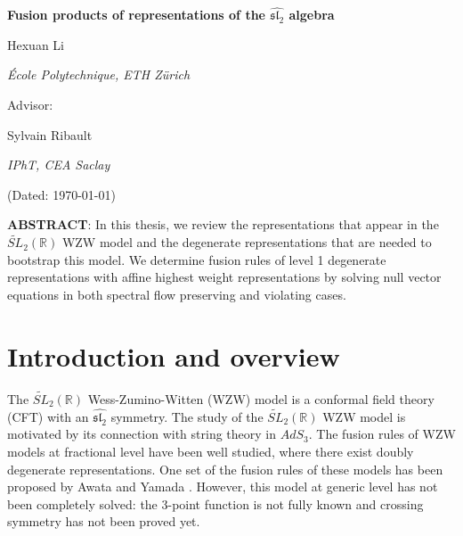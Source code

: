 \documentclass[10pt,a4paper]{article}
\numberwithin{equation}{section}
\newcommand{\TheTitle}{Fusion products of representations of the $\widehat{\mathfrak{sl}_{2}}$ algebra}
\newcommand{\StudentName}{Hexuan Li}
\newcommand{\StudentAffiliation}{École Polytechnique, ETH Zürich} %
\newcommand{\SupervisorName}{Sylvain Ribault}
\newcommand{\SupervisorAffiliation}{IPhT, CEA Saclay}
\begin{document}
\thispagestyle{empty}

\begin{center}

    {\LARGE\bfseries \TheTitle \par}

    \vspace{2cm} %

    {\large \StudentName \par}
    {\itshape \StudentAffiliation \par}

    \vspace{1.5cm} %

    Advisor: {\large \SupervisorName \par}
    {\itshape \SupervisorAffiliation \par}
    
    \vspace{1.5cm} %
    
    (Dated: \today)

\end{center}

\vspace{2cm} %

\noindent
\textbf{ABSTRACT}: In this thesis, we review the representations that appear in the $\widetilde{SL}_{2}(\mathbb{R})$ WZW model and the degenerate representations that are needed 
    to bootstrap this model. 
    We determine fusion rules of level 1 degenerate representations with affine highest weight representations by 
    solving null vector equations in both spectral flow preserving and violating cases. 

\newpage

\tableofcontents

\section{Introduction and overview}
The $\widetilde{SL}_{2}(\mathbb{R})$ Wess-Zumino-Witten (WZW) model is a conformal field theory (CFT) with an 
$\widehat{\mathfrak{sl}_{2}}$ symmetry. The study of the $\widetilde{SL}_{2}(\mathbb{R})$ WZW model is motivated by 
its connection with string theory in $AdS_{3}$. The fusion rules of WZW models at fractional level have been well studied, 
where there exist doubly degenerate representations. One set of the fusion rules of these models has been proposed by 
Awata and Yamada \cite{Awata:1992sm}. However, this model at generic level has not been completely solved: the 3-point function is not 
fully known and crossing symmetry has not been proved yet. 
\end{document}
